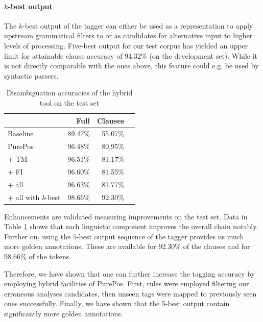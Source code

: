 
\paragraph{$k$-best output}
The $k$-best output of the tagger can either be used as a representation to apply upstream grammatical filters to or as candidates for alternative input to higher levels of processing. 
Five-best output for our test corpus has yielded an upper limit for attainable clause accuracy of 94.32\% (on the development set). 
While it is not directly comparable with the ones above, this feature could e.g. be used by syntactic parsers.


\begin{table}[H]
\centering
\caption{Disambiguation accuracies of the hybrid tool on the test set}
\label{tab:oldhun-test}
\begin{tabular}{l r r r}
\hline
 & Full & Clauses  \\
\hline
Baseline  & 89.47\% & 55.07\% \\
PurePos  & 96.48\% & 80.95\% \\
\hspace{0.2cm} + TM  & 96.51\% & 81.17\% \\
\hspace{0.2cm} + FI  & 96.60\% & 81.55\% \\
\hspace{0.2cm} + all  & 96.63\% & 81.77\% \\
\hspace{0.2cm} + all with \emph{k}-best  & 98.66\% & 92.30\% \\
\hline
\end{tabular}
\end{table}
 
Enhancements are validated measuring improvements on the test set.
Data in Table \ref{tab:oldhun-test} shows that each linguistic component improves the overall chain notably.
Further on, using the $5$-best output sequence of the tagger provides us much more golden annotations. 
These are available for 92.30\% of the clauses and for 98.66\% of the tokens.

Therefore, we have shown that one can further increase the tagging accuracy by employing hybrid facilities of PurePos. 
First, rules were employed filtering our erroneous analyses candidates, then unseen tags were mapped to previously seen ones successfully. 
Finally, we have shown that the 5-best output contain significantly more golden annotations.



